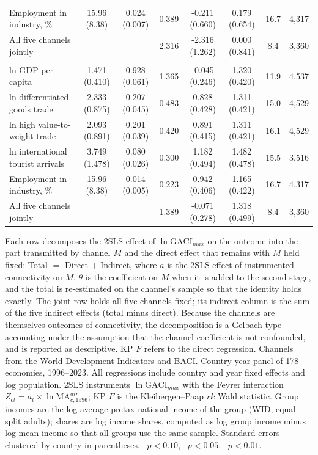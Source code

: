 \begin{table}[p]
\begin{minipage}{\linewidth}
{\begin{tabular}{lccccccr}
Employment in industry, \% & 15.96\sym{*} (8.38) & 0.024\sym{***} (0.007) & 0.389 & -0.211 (0.660) & 0.179 (0.654) & 16.7 & 4{,}317 \\
All five channels jointly & & & 2.316 & -2.316\sym{*} (1.262) & 0.000 (0.841) & 8.4 & 3{,}360 \\
\addlinespace
\multicolumn{8}{l}{\emph{Panel C. Mean income}}\\
ln GDP per capita & 1.471\sym{***} (0.410) & 0.928\sym{***} (0.061) & 1.365 & -0.045 (0.246) & 1.320\sym{***} (0.420) & 11.9 & 4{,}537 \\
ln differentiated-goods trade & 2.333\sym{***} (0.875) & 0.207\sym{***} (0.045) & 0.483 & 0.828\sym{*} (0.428) & 1.311\sym{***} (0.421) & 15.0 & 4{,}529 \\
ln high value-to-weight trade & 2.093\sym{**} (0.891) & 0.201\sym{***} (0.039) & 0.420 & 0.891\sym{**} (0.415) & 1.311\sym{***} (0.421) & 16.1 & 4{,}529 \\
ln international tourist arrivals & 3.749\sym{**} (1.478) & 0.080\sym{***} (0.026) & 0.300 & 1.182\sym{**} (0.494) & 1.482\sym{***} (0.478) & 15.5 & 3{,}516 \\
Employment in industry, \% & 15.96\sym{*} (8.38) & 0.014\sym{***} (0.005) & 0.223 & 0.942\sym{**} (0.406) & 1.165\sym{***} (0.422) & 16.7 & 4{,}317 \\
All five channels jointly & & & 1.389 & -0.071 (0.278) & 1.318\sym{***} (0.499) & 8.4 & 3{,}360 \\
\bottomrule
\end{tabular}}
\par\vspace{3pt}\begin{flushleft}\footnotesize Each row decomposes the 2SLS effect of $\ln\mathrm{GACI}_{max}$ on the outcome into the part transmitted by channel $M$ and the direct effect that remains with $M$ held fixed: Total $=$ Direct $+$ Indirect, where $a$ is the 2SLS effect of instrumented connectivity on $M$, $\theta$ is the coefficient on $M$ when it is added to the second stage, and the total is re-estimated on the channel's sample so that the identity holds exactly. The joint row holds all five channels fixed; its indirect column is the sum of the five indirect effects (total minus direct). Because the channels are themselves outcomes of connectivity, the decomposition is a Gelbach-type accounting under the assumption that the channel coefficient is not confounded, and is reported as descriptive. KP $F$ refers to the direct regression. Channels from the World Development Indicators and BACI. Country-year panel of 178 economies, 1996--2023. All regressions include country and year fixed effects and log population. 2SLS instruments $\ln\mathrm{GACI}_{max}$ with the Feyrer interaction $Z_{ct}=a_t\times\ln\mathrm{MA}^{air}_{c,1996}$; KP $F$ is the Kleibergen--Paap $rk$ Wald statistic. Group incomes are the log average pretax national income of the group (WID, equal-split adults); shares are log income shares, computed as log group income minus log mean income so that all groups use the same sample. Standard errors clustered by country in parentheses. \sym{*}~$p<0.10$, \sym{**}~$p<0.05$, \sym{***}~$p<0.01$.\end{flushleft}

\end{minipage}
\end{table}
